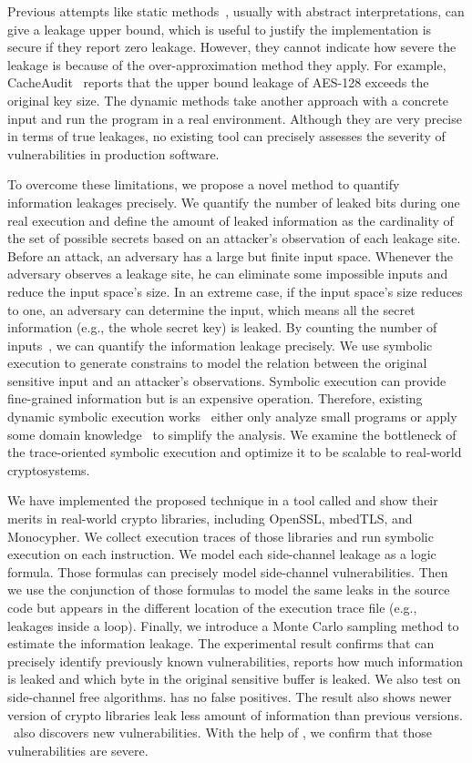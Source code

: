 Previous attempts like static methods~\cite{182946,5207642}, usually with
abstract interpretations, can give a leakage upper bound, which is useful to
justify the implementation is secure if they report zero leakage.
However, they cannot indicate how severe the leakage is because of the
over-approximation method they apply. For example, CacheAudit~\cite{182946} 
reports that the upper
bound leakage of AES-128 exceeds the original key size. The dynamic methods take
another approach with a concrete input and run the program in a real
environment. Although they are very precise in terms of true leakages, no
existing tool can precisely assesses the severity of vulnerabilities in production
software. 

To overcome these limitations, we propose a novel method to quantify information 
leakages precisely. We quantify the number of leaked bits during one real 
execution and define the amount of leaked information as the cardinality of 
the set of possible secrets based on an attacker's observation of each leakage 
site. Before an attack, an adversary has a large but finite input space. 
Whenever the adversary observes a leakage site, he can eliminate some impossible 
inputs and reduce the input space's size. In an extreme case, if the input space's size 
reduces to one, an adversary can determine the input, 
which means all the secret information (e.g., the whole secret key) is
leaked. By counting the number of inputs~\cite{10.1007/11499107_24}, 
we can quantify the information leakage precisely.
We use symbolic execution to generate constrains to model the relation 
between the original sensitive input and an attacker's observations. 
Symbolic execution can provide fine-grained information but is an expensive
operation. Therefore, existing dynamic symbolic
execution works~\cite{203878,236338,Brotzman19Casym} either only analyze
small programs or apply some domain knowledge~\cite{203878} to simplify the analysis. We
examine the bottleneck of the trace-oriented symbolic execution and optimize it
to be scalable to real-world cryptosystems.

We have implemented the proposed technique in a tool called \tool{} and show 
their merits in real-world crypto libraries, including OpenSSL, 
mbedTLS, and Monocypher.
We collect execution traces of those libraries and run 
symbolic execution on each instruction. We model
each side-channel leakage as a logic formula. Those
formulas can precisely model side-channel vulnerabilities. 
Then we use the conjunction of those formulas to model the 
same leaks in the source code but appears in the different location of
the execution trace file (e.g., leakages inside a loop).
Finally, we introduce a Monte Carlo sampling method to estimate 
the information leakage. 
The experimental result confirms
that \tool{} can precisely identify previously known vulnerabilities, 
reports how much information is leaked and which byte in the original sensitive 
buffer is leaked. We also test \tool{} on side-channel free algorithms. 
\tool{} has no false positives.
The result also shows newer version of crypto libraries leak less amount of information 
than previous versions.
\tool\ also discovers new vulnerabilities. With the help of \tool{}, 
we confirm that those vulnerabilities are severe.


